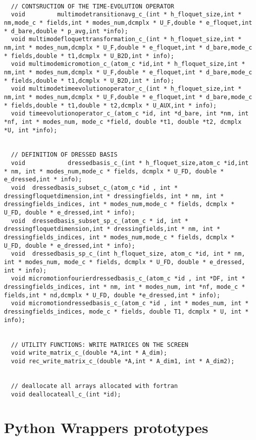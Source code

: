 \documentclass[10pt,a4paper]{article}
\begin{document}
\begin{verbatim}
  
  // CONTSRUCTION OF THE TIME-EVOLUTION OPERATOR
  void         multimodetransitionavg_c_(int * h_floquet_size,int * nm,mode_c * fields,int * modes_num,dcmplx * U_F,double * e_floquet,int * d_bare,double * p_avg,int *info);
  void multimodefloquettransformation_c_(int * h_floquet_size,int * nm,int * modes_num,dcmplx * U_F,double * e_floquet,int * d_bare,mode_c * fields,double * t1,dcmplx * U_B2D,int * info); 
  void multimodemicromotion_c_(atom_c *id,int * h_floquet_size,int * nm,int * modes_num,dcmplx * U_F,double * e_floquet,int * d_bare,mode_c * fields,double * t1,dcmplx * U_B2D,int * info); 
  void multimodetimeevolutionoperator_c_(int * h_floquet_size,int * nm,int * modes_num,dcmplx * U_F,double * e_floquet,int * d_bare,mode_c * fields,double * t1,double * t2,dcmplx * U_AUX,int * info);
  void timeevolutionoperator_c_(atom_c *id, int *d_bare, int *nm, int *nf, int * modes_num, mode_c *field, double *t1, double *t2, dcmplx *U, int *info); 

    
  // DEFINITION OF DRESSED BASIS
  void            dressedbasis_c_(int * h_floquet_size,atom_c *id,int * nm, int * modes_num,mode_c * fields, dcmplx * U_FD, double * e_dressed,int * info); 
  void  dressedbasis_subset_c_(atom_c *id , int * dressingfloquetdimension,int * dressingfields, int * nm, int * dressingfields_indices, int * modes_num,mode_c * fields, dcmplx * U_FD, double * e_dressed,int * info);
  void  dressedbasis_subset_sp_c_(atom_c * id, int * dressingfloquetdimension,int * dressingfields,int * nm, int * dressingfields_indices, int * modes_num,mode_c * fields, dcmplx * U_FD, double * e_dressed,int * info);
  void  dressedbasis_sp_c_(int h_floquet_size, atom_c *id, int * nm, int * modes_num, mode_c * fields, dcmplx * U_FD, double * e_dressed, int * info);
  void micromotionfourierdressedbasis_c_(atom_c *id , int *DF, int * dressingfields_indices, int * nm, int * modes_num, int *nf, mode_c * fields,int * nd,dcmplx * U_FD, double *e_dressed,int * info);
  void micromotiondressedbasis_c_(atom_c *id , int * modes_num, int * dressingfields_indices, mode_c * fields, double T1, dcmplx * U, int * info);

    
  // UTILITY FUNCTIONS: WRITE MATRICES ON THE SCREEN
  void write_matrix_c_(double *A,int * A_dim);
  void rec_write_matrix_c_(double *A,int * A_dim1, int * A_dim2);
  
  
  // deallocate all arrays allocated with fortran
  void deallocateall_c_(int *id);
\end{verbatim}

\section{Python Wrappers prototypes}
\end{document}
